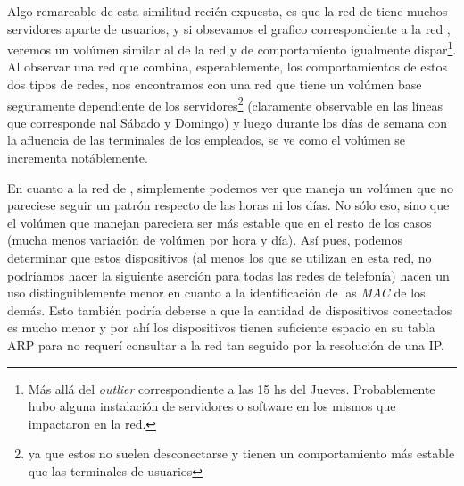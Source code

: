 \par Algo remarcable de esta similitud reci\'en expuesta, es que la red de
 tiene muchos servidores aparte de usuarios, y si obsevamos
el grafico correspondiente a la red , veremos un vol\'umen
similar al de la red  y de comportamiento igualmente
dispar\footnote{M\'as all\'a del \textit{outlier} correspondiente a las
15 hs del Jueves. Probablemente hubo alguna instalaci\'on de servidores o
software en los mismos que impactaron en la red.}. Al observar
una red que combina, esperablemente, los comportamientos de estos dos tipos
de redes, nos encontramos con una red que tiene un vol\'umen base seguramente
dependiente de los servidores\footnote{ya que estos no suelen desconectarse y
tienen un comportamiento m\'as estable que las terminales de usuarios}
(claramente observable en las l\'ineas que corresponde nal S\'abado y Domingo)
y luego durante los d\'ias de semana con la afluencia de las terminales de
los empleados, se ve como el vol\'umen se incrementa not\'ablemente.

\par En cuanto a la red de , simplemente podemos ver
que maneja un vol\'umen que no pareciese seguir un patr\'on respecto
de las horas ni los d\'ias. No s\'olo eso, sino que el vol\'umen que manejan
pareciera ser m\'as estable que en el resto de los casos (mucha menos
variaci\'on de vol\'umen por hora y d\'ia). As\'i pues, podemos determinar
que estos dispositivos (al menos los que se utilizan en esta red, no podr\'iamos
hacer la siguiente aserci\'on para todas las redes de telefon\'ia) hacen un
uso distinguiblemente menor en cuanto a la identificaci\'on de las \textit{MAC}
de los dem\'as. Esto tambi\'en podr\'ia deberse a que la cantidad de dispositivos
conectados es mucho menor y por ah\'i los dispositivos tienen suficiente
espacio en su tabla ARP para no requer\'i consultar a la red tan seguido por la
resoluci\'on de una IP.


